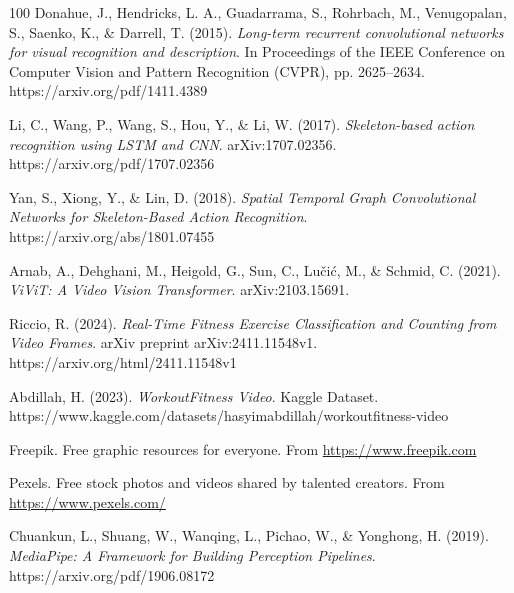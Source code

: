 \documentclass[journal,onecolumn, 11pt]{IEEEtran}
\begin{document}
%
%
%
\begin{thebibliography}{100}
Donahue, J., Hendricks, L. A., Guadarrama, S., Rohrbach, M., Venugopalan, S., Saenko, K., \& Darrell, T. (2015). 
\textit{Long-term recurrent convolutional networks for visual recognition and description}. 
In Proceedings of the IEEE Conference on Computer Vision and Pattern Recognition (CVPR), pp. 2625–2634.
https://arxiv.org/pdf/1411.4389

Li, C., Wang, P., Wang, S., Hou, Y., \& Li, W. (2017). 
\textit{Skeleton-based action recognition using LSTM and CNN}. arXiv:1707.02356. 
https://arxiv.org/pdf/1707.02356

Yan, S., Xiong, Y., \& Lin, D. (2018). 
\textit{Spatial Temporal Graph Convolutional Networks for Skeleton-Based Action Recognition}. https://arxiv.org/abs/1801.07455

Arnab, A., Dehghani, M., Heigold, G., Sun, C., Lučić, M., \& Schmid, C. (2021). 
\textit{ViViT: A Video Vision Transformer}. arXiv:2103.15691. 

Riccio, R. (2024). \textit{Real-Time Fitness Exercise Classification and Counting from Video Frames}. arXiv preprint arXiv:2411.11548v1.
https://arxiv.org/html/2411.11548v1

Abdillah, H. (2023). \textit{WorkoutFitness Video}. Kaggle Dataset. https://www.kaggle.com/datasets/hasyimabdillah/workoutfitness-video

Freepik. Free graphic resources for everyone. From \url{https://www.freepik.com}

Pexels. Free stock photos and videos shared by talented creators. From \url{https://www.pexels.com/}


Chuankun, L., Shuang, W., Wanqing, L., Pichao, W., \& Yonghong, H. (2019). 
\textit{MediaPipe: A Framework for Building Perception Pipelines}.
https://arxiv.org/pdf/1906.08172


\end{thebibliography}
\end{document}
